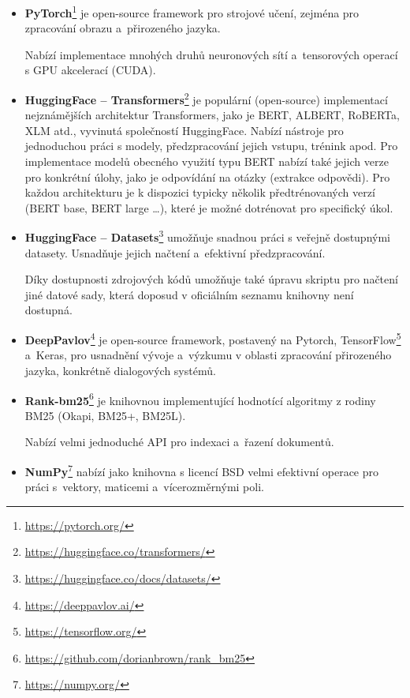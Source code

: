 \begin{itemize}
    \item \textbf{PyTorch}\footnote{\url{https://pytorch.org/}}
    je open-source framework pro strojové učení, zejména pro zpracování obrazu a~přirozeného jazyka. \par
    Nabízí implementace mnohých druhů neuronových sítí a~tensorových operací s GPU akcelerací (CUDA).
    
    \item \textbf{HuggingFace -- Transformers}\footnote{\url{https://huggingface.co/transformers/}}
    je populární (open-source) implementací nejznámějších architektur Transformers, jako je BERT, ALBERT,  RoBERTa, XLM atd., vyvinutá společností HuggingFace. Nabízí nástroje pro jednoduchou práci s modely, předzpracování jejich vstupu, trénink apod. Pro implementace modelů obecného využití typu BERT nabízí také jejich verze pro konkrétní úlohy, jako je odpovídání na otázky (extrakce odpovědi). Pro každou architekturu je k dispozici typicky několik předtrénovaných verzí (BERT base, BERT large \dots), které je možné dotrénovat pro specifický úkol.\par
    
    \item \textbf{HuggingFace -- Datasets}\footnote{\url{https://huggingface.co/docs/datasets/}}
    umožňuje snadnou práci s veřejně dostupnými datasety. Usnadňuje jejich načtení a~efektivní předzpracování.\par 
    Díky dostupnosti zdrojových kódů umožňuje také úpravu skriptu pro načtení jiné datové sady, která doposud v oficiálním seznamu knihovny není dostupná.
    
    \item \textbf{DeepPavlov}\footnote{\url{https://deeppavlov.ai/}}
    je open-source framework, postavený na Pytorch, TensorFlow\footnote{\url{https://tensorflow.org/}} a~Keras, pro usnadnění vývoje a~výzkumu v oblasti zpracování přirozeného jazyka, konkrétně dialogových systémů.
    
    \item \textbf{Rank-bm25}\footnote{\url{https://github.com/dorianbrown/rank\_bm25}}
    je knihovnou implementující hodnotící algoritmy z rodiny BM25 \cite{bm25_improvements} (Okapi, BM25+, BM25L).\par
    Nabízí velmi jednoduché API pro indexaci a~řazení dokumentů.
    
    \item \textbf{NumPy}\footnote{\url{https://numpy.org/}}
    nabízí jako knihovna s licencí BSD velmi efektivní operace pro práci s~vektory, maticemi a~vícerozměrnými poli. 
    

\end{itemize}
